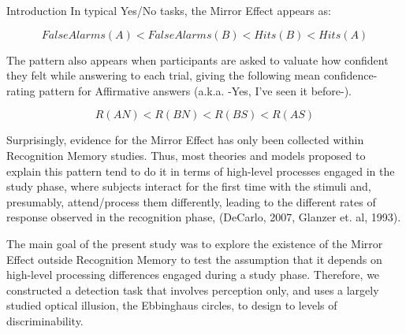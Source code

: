 \documentclass[final]{beamer}
\newlength{\onecolwid}
\begin{document}
\begin{frame}[t]
\begin{columns}[t]
\begin{column}{\onecolwid}
\begin{alertblock}{Introduction}
In typical Yes/No tasks, the Mirror Effect appears as:


\begin{equation}
FalseAlarms(A) < FalseAlarms(B) < Hits(B) < Hits(A)
\label{eqn:Rates}
\end{equation}



The pattern also appears when participants are asked to valuate how confident they felt while answering to each trial, giving the following mean confidence-rating pattern for Affirmative answers (a.k.a. -Yes, I've seen it before-).



\begin{equation}
R(AN) < R(BN) < R(BS) < R(AS)
\label{eqn:Confidence}
\end{equation}




Surprisingly, evidence for the Mirror Effect has only been collected within Recognition Memory studies. Thus, most theories and models proposed to explain this pattern tend to do it in terms of high-level processes engaged in the study phase, where subjects interact for the first time with the stimuli and, presumably, attend/process them differently, leading to the different rates of response observed in the recognition phase, (DeCarlo, 2007, Glanzer et. al, 1993). 












The main goal of the present study was to explore the existence of the Mirror Effect outside Recognition Memory to test the assumption that it depends on high-level processing differences engaged during a study phase. Therefore, we constructed a detection task that involves perception only, and uses a largely studied optical illusion, the Ebbinghaus circles, to design to levels of discriminability.




\end{alertblock}





\end{column}
\end{columns}
\end{frame}
\end{document}
